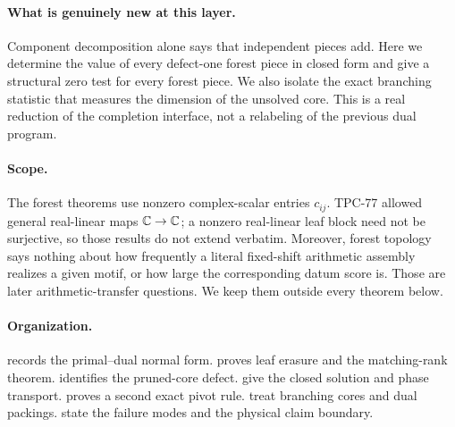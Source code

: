 \paragraph{What is genuinely new at this layer.}
Component decomposition alone says that independent pieces add.
Here we determine the value of every defect-one forest piece in closed
form and give a structural zero test for every forest piece.  We also
isolate the exact branching statistic that measures the dimension of
the unsolved core.  This is a real reduction of the completion
interface, not a relabeling of the previous dual program.

\paragraph{Scope.}
The forest theorems use nonzero complex-scalar entries \(c_{ij}\).
TPC-77 allowed general real-linear maps \(\mathbb C\to\mathbb C\); a nonzero
real-linear leaf block need not be surjective, so those results do not
extend verbatim.  Moreover, forest topology says nothing about how
frequently a literal fixed-shift arithmetic assembly realizes a given
motif, or how large the corresponding datum score is.  Those are later
arithmetic-transfer questions.  We keep them outside every theorem
below.

\paragraph{Organization.}
 records the primal--dual normal form.
 proves leaf erasure and the matching-rank theorem.
 identifies the pruned-core defect.
 give the closed solution and phase
transport.   proves a second exact pivot rule.
 treat branching cores and dual
packings.   state the
failure modes and the physical claim boundary.

